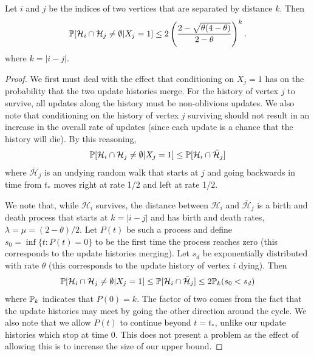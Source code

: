 \begin{lemma}
	\label{lem:A_ij bound conditioned}
		Let $i$ and $j$ be the indices of two vertices that are separated by distance $k$. Then
		\begin{equation}
			\mathbb{P}[\mathcal{H}_i \cap \mathcal{H}_j \neq \emptyset|X_{j} = 1] \leq 2\left(\frac{2 - \sqrt{\theta(4 - \theta)}}{2 - \theta}\right)^k.
		\end{equation}
		where $k = |i - j|$.
	\end{lemma}
	\begin{proof}
		We first must deal with the effect that conditioning on $X_j = 1$ has on the probability that the two update histories merge. For the history of vertex $j$ to survive, all updates along the history must be non-oblivious updates. We also note that conditioning on the history of vertex $j$ surviving should not result in an increase in the overall rate of updates (since each update is a chance that the history will die). By this reasoning, 
		\begin{equation}
			\mathbb{P}[\mathcal{H}_i \cap \mathcal{H}_j \neq \emptyset | X_j = 1] \leq \mathbb{P}[\mathcal{H}_i \cap \bar{\mathcal{H}}_j]
		\end{equation}
		where $\bar{\mathcal{H}}_j$ is an undying random walk that starts at $j$ and going backwards in time from $t_*$ moves right at rate 1/2 and left at rate 1/2.

		We note that, while $\mathcal{H}_i$ survives, the distance between $\mathcal{H}_i$ and $\bar{\mathcal{H}}_j$ is a birth and death process that starts at $k = |i - j|$ and has birth and death rates, $\lambda = \mu = (2 - \theta)/2$. Let $P(t)$ be such a process and define $s_0  = \inf\{t : P(t) = 0\}$ to be the first time the process reaches zero (this corresponds to the update histories merging). Let $s_d$ be exponentially distributed with rate $\theta$ (this corresponds to the update history of vertex $i$ dying). Then
		\begin{align}
		 	\mathbb{P}[\mathcal{H}_i \cap \mathcal{H}_j \neq \emptyset | X_j = 1] \leq \mathbb{P}[\mathcal{H}_i \cap \bar{\mathcal{H}}_j] \leq 2 \mathbb{P}_k(s_0 < s_d)
		 \end{align} 
		 where $\mathbb{P}_k$ indicates that $P(0) = k$. 
		 The factor of two comes from the fact that the update histories may meet by going the other direction around the cycle. We also note that we allow $P(t)$ to continue beyond $t = t_*$, unlike our update histories which stop at time $0$. This does not present a problem as the effect of allowing this is to increase the size of our upper bound.


\end{proof}
